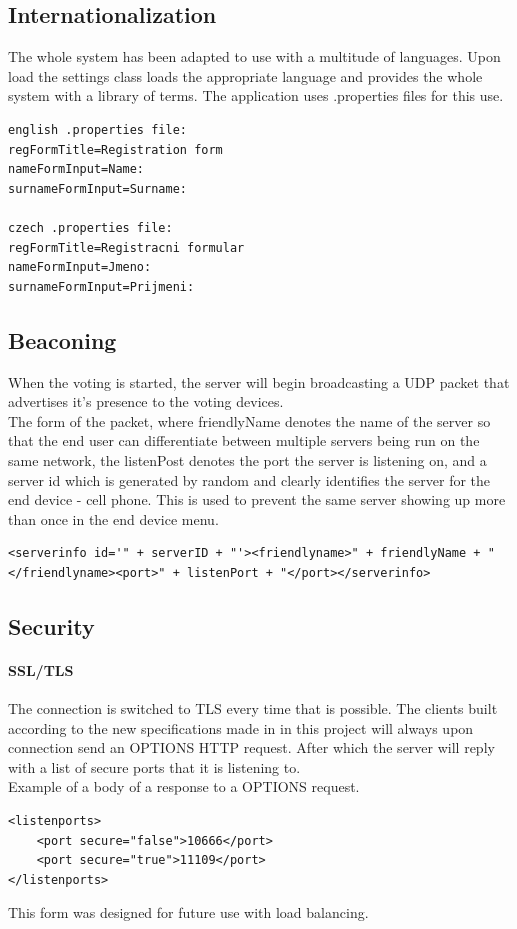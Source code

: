 \documentclass[11pt,twoside,a4paper]{book}
\begin{document}
\subsection{Internationalization}
The whole system has been adapted to use with a multitude of languages. Upon load the settings class loads the appropriate language and provides the whole system with a library of terms. The application uses .properties files for this use.



\begin{lstlisting}
english .properties file:
regFormTitle=Registration form
nameFormInput=Name:
surnameFormInput=Surname:

czech .properties file:
regFormTitle=Registracni formular
nameFormInput=Jmeno:
surnameFormInput=Prijmeni:
\end{lstlisting}

\subsection{Beaconing}
When the voting is started, the server will begin broadcasting a UDP packet that advertises it's presence to the voting devices. \\

The form of the packet, where friendlyName denotes the name of the server so that the end user can differentiate between multiple servers being run on the same network, the listenPost denotes the port the server is listening on, and a server id which is generated by random and clearly identifies the server for the end device - cell phone. This is used to prevent the same server showing up more than once in the end device menu.
\begin{lstlisting}
<serverinfo id='" + serverID + "'><friendlyname>" + friendlyName + "</friendlyname><port>" + listenPort + "</port></serverinfo>
\end{lstlisting}
\subsection{Security}
\paragraph{SSL/TLS}
The connection is switched to TLS every time that is possible. The clients built according to the new specifications made in in this project will always upon connection send an OPTIONS HTTP request. After which the server will reply with a list of secure ports that it is listening to.\\
Example of a body of a response to a OPTIONS request.
\begin{lstlisting}
<listenports>
	<port secure="false">10666</port>
	<port secure="true">11109</port>
</listenports>
\end{lstlisting}
This form was designed for future use with load balancing.
\end{document}
